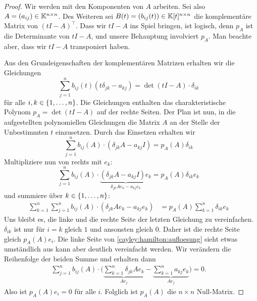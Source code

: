\begin{proof}
	Wir werden mit den Komponenten von $A$ arbeiten. Sei also $ A = (a_{ij}) \in \mathbb K^{n \times n} $. Des Weiteren sei $ B(t) = (b_{ij}(t)) \in \mathbb K[t]^{n \times n} $ die komplementäre Matrix von $ (tI - A)^\top $. Dass wir $t I - A$ ins Spiel bringen, ist logisch, denn $p_A$ ist die Determinante von $t I -A$, und unsere Behauptung involviert $p_A$. Man beachte aber, dass wir $t I - A$ transponiert haben. 
	
	Aus den Grundeigenschaften der komplementären Matrizen erhalten wir die Gleichungen 
	\begin{equation*}
		\sum_{j=1}^n b_{ij}(t) (t \delta_{jk} - a_{kj}) = \det(tI - A) \cdot \delta_{ik}
	\end{equation*}
	für alle $ i,k \in \{ 1,\ldots,n \} $. Die Gleichungen enthalten das charakteristische Polynom $p_A = \det(t I - A)$ auf der rechte Seiten. Der Plan ist nun, in die aufgestellten polynomiellen Gleichungen die Matrix $A$ an der Stelle der Unbestimmten $t$ einzusetzen. Durch das Einsetzen erhalten wir
	\begin{equation*}
		\sum_{j=1}^{n} b_{ij}(A) \cdot (\delta_{jk}A - a_{kj}I) = p_A(A)\delta_{ik}
	\end{equation*}
	Multipliziere nun von rechts mit $ e_k $:
	\begin{equation*}
		\sum_{j=1}^{n} b_{ij}(A) \cdot \underbrace{(\delta_{jk}A - a_{kj}I) e_k}_{\delta_{jk}Ae_k - a_{kj}e_k} = p_A(A)\delta_{ik} e_k
	\end{equation*}
	und summiere über $ k \in \{ 1,\ldots,n \} $:
	\begin{align}
		\label{cayley:hamilton:aufloesung} 
		\sum_{k=1}^{n} \sum_{j=1}^{n} b_{ij}(A) \cdot (\delta_{jk}Ae_k - a_{kj}e_k) &= p_A(A) \sum_{k=1}^{n} \delta_{ik} e_k 
	\end{align}
	Uns bleibt es, die linke und die rechte Seite der letzten Gleichung zu vereinfachen. $\delta_{ik}$ ist nur für $i=k$ gleich $1$ und ansonsten gleich $0$. Daher ist die rechte Seite gleich $p_A(A) e_i$. Die linke Seite von \eqref{cayley:hamilton:aufloesung} sieht etwas umständlich aus kann aber deutlich vereinfacht werden. Wir verändern die Reihenfolge der beiden Summe und erhalten dann
	\begin{align*}
		\sum_{j=1}^{n} b_{ij}(A) \cdot \Bigg(
		\underbrace{\sum_{k=1}^{n} \delta_{jk}Ae_k}_{Ae_j} -
		\underbrace{\sum_{k=1}^{n} a_{kj}e_k}_{Ae_j}
		\Bigg) = 0.
	\end{align*}
	Also ist $p_A(A) e_i = 0$ für alle $i$. Folglich ist $p_A(A)$ die $n \times n$ Null-Matrix. 
\end{proof}

